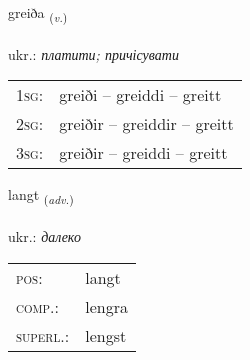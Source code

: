 \documentclass[frontgrid, backgrid]{flacards}\usepackage[]{graphicx}\usepackage[]{xcolor}
\begin{document}
\renewcommand{\blhead}{\vskip5pt {\small\bfseries\footnotesize Sagnorð | дієслово }}
\renewcommand{\bcfoot}{\vskip5pt \hspace{2pt}{\small\bfseries\footnotesize 1K}}


{greiða \small{\textsubscript{(\textit{v.})}} \\[1ex] %
\textphonetic{[kreiːða]} \\
ukr.: \emph{платити; причісувати} \\  [2ex]
\renewcommand*{\arraystretch}{0.8}
\begin{tabular}{p{1cm}l}
\textsc{1sg}: & greiði -- greiddi -- greitt \\ 
\textsc{2sg}: & greiðir -- greiddir -- greitt \\ 
\textsc{3sg}: & greiðir -- greiddi -- greitt \\ 
\end{tabular}
}

\renewcommand{\flhead}{\vskip5pt \fboxsep=0pt {\small\bfseries\footnotesize Atviksorð | прислівник}}
\renewcommand{\fcfoot}{\vskip5pt \fboxsep=0pt \hspace{2pt}{\small\bfseries\footnotesize 1K}}

\renewcommand{\blhead}{\vskip5pt {\small\bfseries\footnotesize Atviksorð | прислівник }}
\renewcommand{\bcfoot}{\vskip5pt \hspace{2pt}{\small\bfseries\footnotesize 1K}}


{langt \small{\textsubscript{(\textit{adv.})}} \\[1ex] %
\textphonetic{[lauŋ̊t]} \\
ukr.: \emph{далеко} \\  [2ex]
\renewcommand*{\arraystretch}{0.8}
\begin{tabular}{ll}
\textsc{pos}: & langt \\ 
\textsc{comp.}: & lengra \\ 
\textsc{superl.}: & lengst \\
\end{tabular}
}
\end{document}
